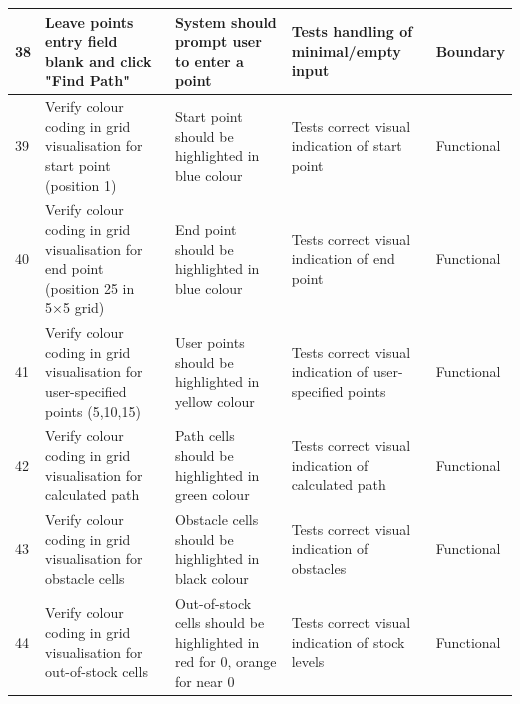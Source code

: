 \begin{longtable}{|p{}|p{}|p{}|p{}|p{}|}
	\hline
	38 & Leave points entry field blank and click "Find Path" & System should prompt user to enter a point & Tests handling of minimal/empty input & Boundary \\
	\hline
	39 & Verify colour coding in grid visualisation for start point (position 1) & Start point should be highlighted in blue colour & Tests correct visual indication of start point & Functional\\
	\hline
	40 & Verify colour coding in grid visualisation for end point (position 25 in 5×5 grid) & End point should be highlighted in blue colour & Tests correct visual indication of end point & Functional \\
	\hline
	41 & Verify colour coding in grid visualisation for user-specified points (5,10,15) & User points should be highlighted in yellow colour & Tests correct visual indication of user-specified points & Functional \\
	\hline
	42 & Verify colour coding in grid visualisation for calculated path & Path cells should be highlighted in green colour & Tests correct visual indication of calculated path & Functional \\
	\hline
	43 & Verify colour coding in grid visualisation for obstacle cells & Obstacle cells should be highlighted in black colour & Tests correct visual indication of obstacles & Functional \\
	\hline
	44 & Verify colour coding in grid visualisation for out-of-stock cells & Out-of-stock cells should be highlighted in red for 0, orange for near 0 & Tests correct visual indication of stock levels & Functional \\
	\hline
\end{longtable}